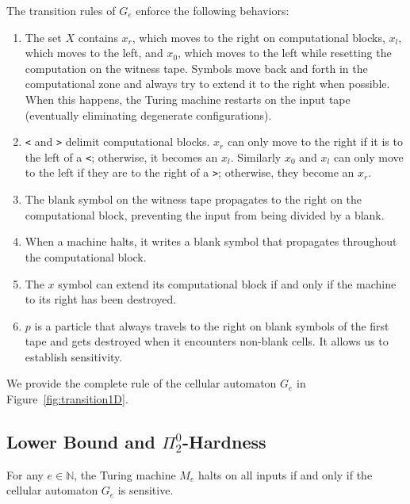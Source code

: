 \documentclass{llncs}
\begin{document}
The transition rules of $G_e$ enforce the following behaviors:

\begin{enumerate}
	\item The set $X$ contains $x_r$, which moves to the right on computational blocks, $x_l$, which moves to the left, and $x_0$, which moves to the left while resetting the computation on the witness tape. Symbols move back and forth in the computational zone and always try to extend it to the right when possible. When this happens, the Turing machine restarts on the input tape (eventually eliminating degenerate configurations).
	\item \texttt{<} and \texttt{>} delimit computational blocks. $x_r$ can only move to the right if it is to the left of a \texttt{<}; otherwise, it becomes an $x_l$. Similarly $x_0$ and $x_l$ can only move to the left if they are to the right of a \texttt{>}; otherwise, they become an $x_r$.
	\item The blank symbol on the witness tape propagates to the right on the computational block, preventing the input from being divided by a blank.  
	\item When a machine halts, it writes a blank symbol that propagates throughout the computational block.
	\item The $x$ symbol can extend its computational block if and only if the machine to its right has been destroyed.
	\item $p$ is a particle that always travels to the right on blank symbols of the first tape and gets destroyed when it encounters non-blank cells. It allows us to establish sensitivity.  
\end{enumerate}

We provide the complete rule of the cellular automaton $G_e$ in Figure~\ref{fig:transition1D}.



\subsection{Lower Bound and $\Pi^0_2$-Hardness}

\begin{lemma}\label{lemma:1Dhard}
For any $e \in \mathbb{N}$, the Turing machine $M_e$ halts on all inputs if and only if the cellular automaton $G_e$ is sensitive.
\end{lemma}
\end{document}
